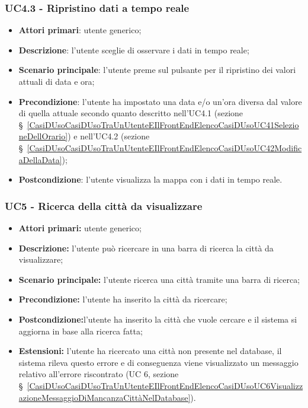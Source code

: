 \subsubsection{UC4.3 - Ripristino dati a tempo reale}\label{CasiDUsoCasiDUsoTraUnUtenteEIlFrontEndElencoCasiDUsoUC43RipristinoDatiATempoReale}
\begin{itemize}
	\item \textbf{Attori primari}: utente generico;
	\item \textbf{Descrizione}:  l’utente sceglie di osservare i dati in tempo reale;
	\item \textbf{Scenario principale}: l’utente preme sul pulsante per il ripristino dei valori attuali di data e ora;
	\item \textbf{Precondizione}: l’utente ha impostato una data e/o un’ora diversa dal valore di quella attuale secondo quanto descritto nell'UC4.1 (sezione \S~\ref{CasiDUsoCasiDUsoTraUnUtenteEIlFrontEndElencoCasiDUsoUC41SelezioneDellOrario}) e nell'UC4.2 (sezione \S~\ref{CasiDUsoCasiDUsoTraUnUtenteEIlFrontEndElencoCasiDUsoUC42ModificaDellaData});
	\item \textbf{Postcondizione}: l’utente visualizza la mappa con i dati in tempo reale.
\end{itemize}

\subsubsection{UC5 - Ricerca della città da visualizzare}\label{CasiDUsoCasiDUsoTraUnUtenteEIlFrontEndElencoCasiDUsoUC5RicercaDellaCittàDaVisualizzare}

\begin{itemize}
	\item \textbf{Attori primari:} utente generico;
	\item \textbf{Descrizione:} l’utente può ricercare in una barra di ricerca la città da visualizzare;
	\item \textbf{Scenario principale:} l’utente ricerca una città tramite una barra di ricerca;
	\item \textbf{Precondizione:} l’utente ha inserito la città da ricercare;
	\item \textbf{Postcondizione:}l’utente ha inserito la città che vuole cercare e il sistema si aggiorna in base alla ricerca fatta;
	\item \textbf{Estensioni:} l’utente ha ricercato una città non presente nel database, il sistema rileva questo errore e di conseguenza viene visualizzato un messaggio relativo all’errore riscontrato (UC 6, sezione \S~\ref{CasiDUsoCasiDUsoTraUnUtenteEIlFrontEndElencoCasiDUsoUC6VisualizzazioneMessaggioDiMancanzaCittàNelDatabase}).
\end{itemize}

